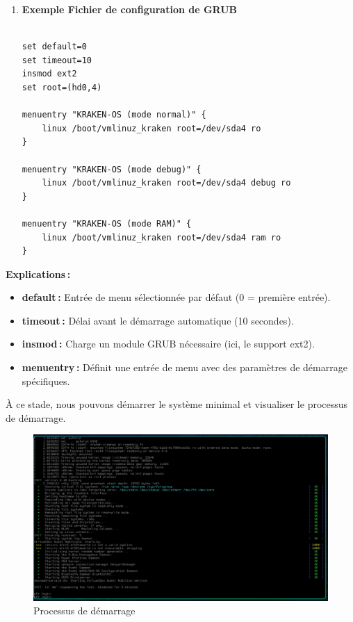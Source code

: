 \begin{enumerate}
  \item \textbf{ Exemple Fichier de configuration de GRUB}  

  \begin{verbatim}

set default=0
set timeout=10
insmod ext2
set root=(hd0,4) 

menuentry "KRAKEN-OS (mode normal)" {
    linux /boot/vmlinuz_kraken root=/dev/sda4 ro
}

menuentry "KRAKEN-OS (mode debug)" {
    linux /boot/vmlinuz_kraken root=/dev/sda4 debug ro
}

menuentry "KRAKEN-OS (mode RAM)" {
    linux /boot/vmlinuz_kraken root=/dev/sda4 ram ro
}

  \end{verbatim}
\end{enumerate}
\textbf{Explications :}
  \begin{itemize}
    \item \textbf{default :} Entrée de menu sélectionnée par défaut (0 = première entrée).
    \item \textbf{timeout :} Délai avant le démarrage automatique (10 secondes).
    \item \textbf{insmod :} Charge un module GRUB nécessaire (ici, le support ext2).
    \item \textbf{menuentry :} Définit une entrée de menu avec des paramètres de démarrage spécifiques.
  \end{itemize}


\clearpage
À ce stade, nous pouvons démarrer le système minimal et visualiser le processus de démarrage.

\begin{figure}[H]
    \centering
    \includegraphics[width=1\textwidth]{images_pfe/corebuildbooscrpts.png}
    \caption{Processus de démarrage}
    \label{fig:bootproc}
\end{figure}


